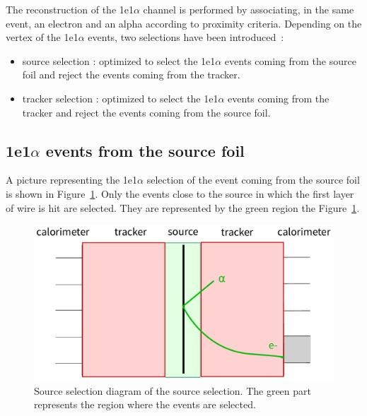 \documentclass[main.tex]{subfiles}
\begin{document}
\bigskip


\noindent  The reconstruction of the 1e1$\alpha$ channel is performed by associating, in the same event, an electron and an alpha according to proximity criteria. Depending on the vertex of the 1e1$\alpha$ events, two selections have been introduced~: 


\begin{itemize}
\item source selection : optimized to select the 1e1$\alpha$ events coming from the source foil and reject the events coming from the tracker.

\item tracker selection : optimized to select the 1e1$\alpha$ events coming from the tracker and reject the events coming from the source foil.
\end{itemize}


\subsection{1e1$\alpha$ events from the source foil}


\noindent A picture representing the 1e1$\alpha$ selection of the event coming from the source foil is shown in Figure~\ref{cartoon_source_selection}. Only the events close to the source in which the first layer of wire is hit are selected. They are represented by the green region the Figure~\ref{cartoon_source_selection}.


\begin{figure}[h!]
\begin{center}
\includegraphics[scale=0.6]{pictures/Chap5/cartoon_source_selection.pdf}
\caption{Source selection diagram of the source selection. The green part represents the region where the events are selected.}
\label{cartoon_source_selection}
\end{center}
\end{figure}
\end{document}

